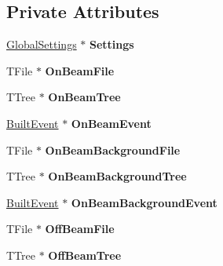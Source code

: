 \subsection*{Private Attributes}
\begin{DoxyCompactItemize}
\item 
\mbox{\label{class_event_builder_a94aab3d55a56f438197db6bc09cb4c93}} 
\hyperlink{class_global_settings}{Global\+Settings} $\ast$ {\bfseries Settings}
\item 
\mbox{\label{class_event_builder_a5efb112986e5be473fad2377d162f901}} 
T\+File $\ast$ {\bfseries On\+Beam\+File}
\item 
\mbox{\label{class_event_builder_a55598b7592ab2e97ccbab1d5bc9bd3ba}} 
T\+Tree $\ast$ {\bfseries On\+Beam\+Tree}
\item 
\mbox{\label{class_event_builder_a06ecb6ed57fe764a43f30c737fa304ee}} 
\hyperlink{class_built_event}{Built\+Event} $\ast$ {\bfseries On\+Beam\+Event}
\item 
\mbox{\label{class_event_builder_a5bb1252e99bae09707fd20de51ffd703}} 
T\+File $\ast$ {\bfseries On\+Beam\+Background\+File}
\item 
\mbox{\label{class_event_builder_a6c710645c7dd1e3b85fa0c5c7bb3a2ff}} 
T\+Tree $\ast$ {\bfseries On\+Beam\+Background\+Tree}
\item 
\mbox{\label{class_event_builder_ad3a26cd323f583d45fb572929c8e14ad}} 
\hyperlink{class_built_event}{Built\+Event} $\ast$ {\bfseries On\+Beam\+Background\+Event}
\item 
\mbox{\label{class_event_builder_ae3c184017092b759b7af047a8bc3c76c}} 
T\+File $\ast$ {\bfseries Off\+Beam\+File}
\item 
\mbox{\label{class_event_builder_ad39ee1e9984468f865d2339fcec51fae}} 
T\+Tree $\ast$ {\bfseries Off\+Beam\+Tree}
\item 
\mbox{\label{class_event_builder_a33fa364106a147d69464ed801914c039}} 

\end{DoxyCompactItemize}
